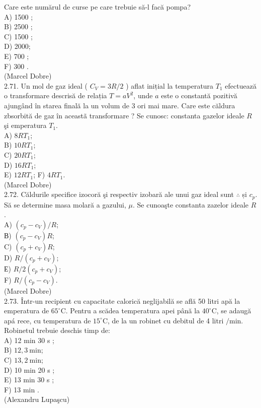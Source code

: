 Care este numărul de curse pe care trebuie să-l facă pompa?\\
A) 1500 ;\\
B) 2500 ;\\
C) 1500 ;\\
D) 2000;\\
E) 700 ;\\
F) 300 .\\
(Marcel Dobre)\\
2.71. Un mol de gaz ideal ( $C_{V}=3 R / 2$ ) aflat inițial la temperatura $T_{1}$ efectuează o transformare descrisă de relația $T=a V^{2}$, unde $a$ este o constantă pozitivă ajungând în starea finală la un volum de 3 ori mai mare. Care este căldura\\
zbsorbită de gaz în aceastã transformare ? Se cunosc: constanta gazelor ideale $R$ şi emperatura $T_{1}$.\\
A) $8 R T_{1}$;\\
B) $10 R T_{1}$;\\
C) $20 R T_{1}$;\\
D) $16 R T_{1}$;\\
E) $12 R T_{1}$; F) $4 R T_{1}$.\\
(Marcel Dobre)\\
2.72. Căldurile specifice izocoră şi respectiv izobară ale unui gaz ideal sunt $\therefore$ și $c_{p}$. Să se determine masa molară a gazului, $\mu$. Se cunoaşte constanta zazelor ideale $R$.\\
A) $\left(c_{p}-c_{V}\right) / R$;\\
В) $\left(c_{p}-c_{V}\right) R$;\\
C) $\left(c_{p}+c_{V}\right) R$;\\
D) $R /\left(c_{p}+c_{V}\right)$;\\
Е) $R / 2\left(c_{p}+c_{V}\right)$;\\
F) $R /\left(c_{p}-c_{V}\right)$.\\
(Marcel Dobre)\\
2.73. Într-un recipient cu capacitate calorică neglijabilă se află 50 litri apă la emperatura de $65^{\circ} \mathrm{C}$. Pentru a scădea temperatura apei până la $40^{\circ} \mathrm{C}$, se adaugă apá rece, cu temperatura de $15^{\circ} \mathrm{C}$, de la un robinet cu debitul de 4 litri $/ \mathrm{min}$. Robinetul trebuie deschis timp de:\\
A) 12 min 30 s ;\\
B) $12,3 \mathrm{~min}$;\\
C) $13,2 \mathrm{~min}$;\\
D) 10 min 20 s ;\\
E) 13 min 30 s ;\\
F) 13 min .\\
(Alexandru Lupaşcu)\\

